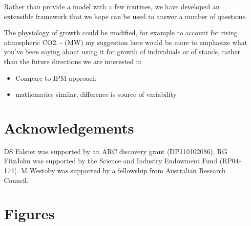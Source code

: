 \documentclass[]{article}
\begin{document}
Rather than provide a model with a few routines, we have developed an
extensible framework that we hope can be used to answer a number of
questions.

The physiology of growth could be modified, for example to account for
rising atmospheric CO2. - (MW) my suggestion here would be more to
emphasize what you've been saying about using it for growth of
individuals or of stands, rather than the future directions we are
interested in

\begin{itemize}
\item
  Compare to IPM approach
\item
  mathematics similar, difference is source of variability
\end{itemize}

\section{Acknowledgements}\label{acknowledgements}

DS Falster was supported by an ARC discovery grant (DP110102086). RG
FitzJohn was supported by the Science and Industry Endowment Fund
(RP04-174). M Westoby was supported by a fellowship from Australian
Research Council.

\clearpage


\clearpage

\section{Figures}\label{figures}
\end{document}
